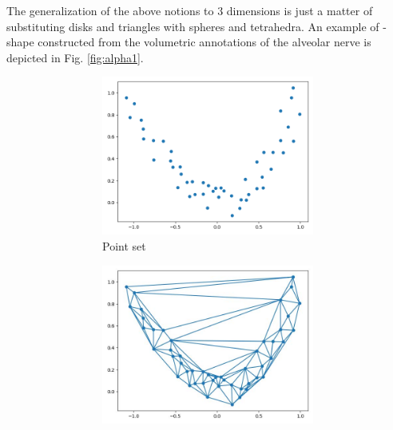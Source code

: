 The generalization of the above notions to $3$ dimensions is just a matter of
substituting disks and triangles with spheres and tetrahedra. An example of
\textalpha-shape constructed from the volumetric annotations of the alveolar
nerve is depicted in Fig. \ref{fig:alpha1}.
\begin{figure}[h!]
  \centering
  \begin{subfigure}{1\textwidth}
    \centering
    \begin{subfigure}{0.24\textwidth}
      \centering
      \includegraphics[width=\textwidth]{Images/alpha_1.png}
      \caption{Point set}
      \label{fig:alpha_1_pointset}
    \end{subfigure}
    \begin{subfigure}{0.24\textwidth}
      \centering
      \includegraphics[width=\textwidth]{Images/alpha_2.jpg}

\end{subfigure}
\end{subfigure}
\end{figure}
